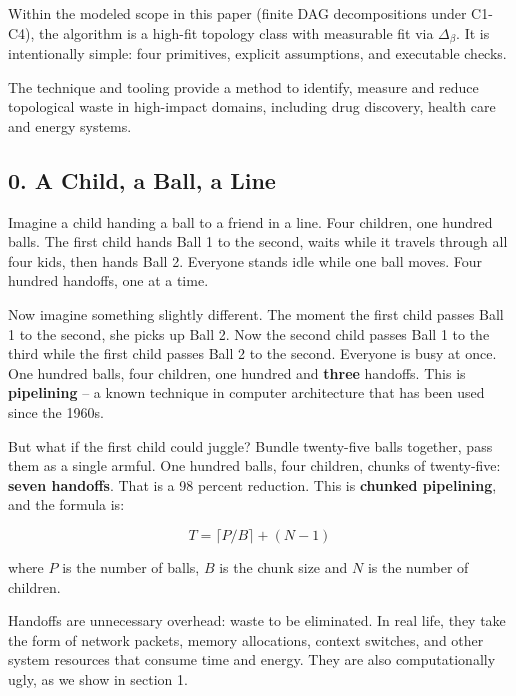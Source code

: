 \documentclass[
  11pt,
]{article}
\begin{document}
Within the modeled scope in this paper (finite DAG decompositions under
C1-C4), the algorithm is a high-fit topology class with measurable fit
via \(\Delta_\beta\). It is intentionally simple: four primitives,
explicit assumptions, and executable checks.

The technique and tooling provide a method to identify, measure and
reduce topological waste in high-impact domains, including drug
discovery, health care and energy systems.

\subsection{0. A Child, a Ball, a Line}\label{a-child-a-ball-a-line}

Imagine a child handing a ball to a friend in a line. Four children, one
hundred balls. The first child hands Ball 1 to the second, waits while
it travels through all four kids, then hands Ball 2. Everyone stands
idle while one ball moves. Four hundred handoffs, one at a time.

Now imagine something slightly different. The moment the first child
passes Ball 1 to the second, she picks up Ball 2. Now the second child
passes Ball 1 to the third while the first child passes Ball 2 to the
second. Everyone is busy at once. One hundred balls, four children, one
hundred and \textbf{three} handoffs. This is \textbf{pipelining} -- a
known technique in computer architecture that has been used since the
1960s.

But what if the first child could juggle? Bundle twenty-five balls
together, pass them as a single armful. One hundred balls, four
children, chunks of twenty-five: \textbf{seven handoffs}. That is a 98
percent reduction. This is \textbf{chunked pipelining}, and the formula
is:

\[
T = \lceil P/B \rceil + (N - 1)
\]

where \(P\) is the number of balls, \(B\) is the chunk size and \(N\) is
the number of children.

Handoffs are unnecessary overhead: waste to be eliminated. In real life,
they take the form of network packets, memory allocations, context
switches, and other system resources that consume time and energy. They
are also computationally ugly, as we show in section 1.
\end{document}
